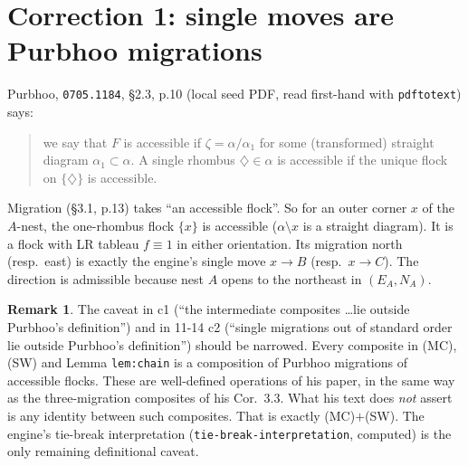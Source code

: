 \documentclass[11pt]{article}
\theoremstyle{definition}
\newtheorem{remark}[theorem]{Remark}
\newcommand{\toB}{\!\to\!B}
\newcommand{\toC}{\!\to\!C}
\begin{document}
\section{Correction 1: single moves are Purbhoo migrations}\label{sec:inside}
Purbhoo, \texttt{0705.1184}, \S2.3, p.10 (local seed PDF, read first-hand with \texttt{pdftotext}) says:
\begin{quote}\small
we say that $F$ is accessible if $\zeta=\alpha/\alpha_1$ for some (transformed) straight diagram $\alpha_1\subset\alpha$. A single
rhombus $\diamondsuit\in\alpha$ is accessible if the unique flock on $\{\diamondsuit\}$ is accessible.
\end{quote}
Migration (\S3.1, p.13) takes ``an accessible flock''. So for an outer corner $x$ of the $A$-nest, the one-rhombus flock $\{x\}$ is
accessible ($\alpha\setminus x$ is a straight diagram). It is a flock with LR tableau $f\equiv1$ in either orientation. Its migration
north (resp.\ east) is exactly the engine's single move $x\toB$ (resp.\ $x\toC$). The direction is admissible because nest $A$
opens to the northeast in $(E_A,N_A)$.
\begin{remark}
The caveat in c1 (``the intermediate composites \dots lie outside Purbhoo's definition'') and in 11-14 c2 (``single migrations out of standard order lie
outside Purbhoo's definition'') should be narrowed. Every composite in (MC), (SW) and Lemma \texttt{lem:chain} is a composition of
Purbhoo migrations of accessible flocks. These are well-defined operations of his paper, in the same way as the three-migration
composites of his Cor.~3.3. What his text does \emph{not} assert is any identity between such composites. That is exactly
(MC)$+$(SW). The engine's tie-break interpretation (\texttt{tie-break-interpretation}, computed) is the only remaining
definitional caveat.
\end{remark}
\end{document}
